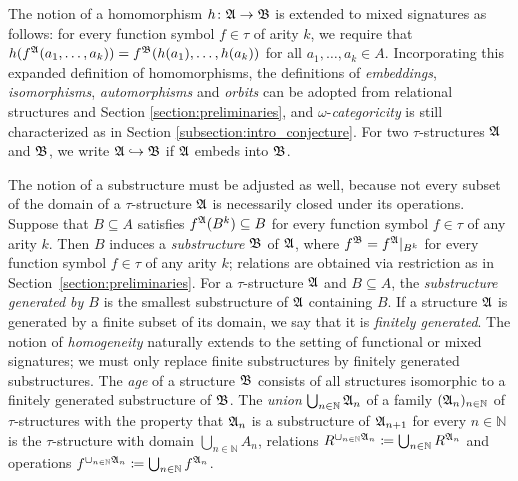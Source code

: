 The notion of a homomorphism $h\colon \mathfrak{A}\rightarrow \mathfrak{B}$ is extended to mixed signatures as follows:
%
for every function symbol $f\in\tau$ of arity $k$, we require that
%
$h(f^{\mathfrak{A}}(a_1,\dots,a_k))=f^{\mathfrak{B}}(h(a_1),\dots,h(a_k))$ for all $a_1,\dots,a_k\in A$.
% 
Incorporating this expanded definition of homomorphisms, the definitions of \emph{embeddings},  \emph{isomorphisms}, \emph{automorphisms} and \emph{orbits} can be adopted from relational structures and Section \ref{section:preliminaries}, and $\omega$-\emph{categoricity} is still characterized as in Section \ref{subsection:intro_conjecture}.
%
For two $\tau$-structures $\mathfrak{A}$ and $\mathfrak{B}$, we write $\mathfrak{A}\hookrightarrow\mathfrak{B}$ if $\mathfrak{A}$ embeds into $\mathfrak{B}$.

The notion of a substructure must be adjusted as well, because not every subset of the domain of a $\tau$-structure $\mathfrak{A}$ is necessarily closed under its operations.
%
Suppose that $B\subseteq A$ satisfies $f^{\mathfrak{A}}(B^k)\subseteq B$ for every function symbol $f\in\tau$ of any arity $k$.
%
Then $B$ induces a \emph{substructure} $\mathfrak{B}$ of $\mathfrak{A}$, where $f^{\mathfrak{B}} =  f^{\mathfrak{A}}|_{B^k}$ for every function symbol $f\in\tau$ of any arity $k$; relations are obtained via restriction as in Section~\ref{section:preliminaries}.
%
For a $\tau$-structure $\mathfrak{A}$ and $B\subseteq A$, the \emph{substructure generated by $B$} is the smallest substructure of $\mathfrak{A}$ containing $B$. 
%
If a structure $\mathfrak{A}$ is generated by a finite subset of its domain, we say that it is  \emph{finitely generated}.
%
The notion of \emph{homogeneity} naturally extends to the setting of functional or mixed signatures; we must only replace finite substructures by finitely generated substructures.
%
The \emph{age} of a structure $\mathfrak{B}$ consists of all structures isomorphic to a finitely generated substructure of $\mathfrak{B}$.
%
The \emph{union} $\bigcup_{n\in \mathbb{N}} \mathfrak{A}_n$ of a family $(\mathfrak{A}_n)_{n\in \mathbb{N}}$ of $\tau$-structures with the property that $\mathfrak{A}_n$ is a substructure of $\mathfrak{A}_{n+1}$ for every $n\in \mathbb{N}$ is the $\tau$-structure with domain $\bigcup_{n\in \mathbb{N}} A_n $, relations $R^{\cup_{n\in \mathbb{N}} \mathfrak{A}_n}\mathrel{\mathop:}\mathrel{\mkern-1.2mu}= \bigcup_{n\in \mathbb{N}} R^{\mathfrak{A}_n}$ and operations $f^{\cup_{n\in \mathbb{N}} \mathfrak{A}_n}\mathrel{\mathop:}\mathrel{\mkern-1.2mu}= \bigcup_{n\in \mathbb{N}} f^{\mathfrak{A}_n}$.

